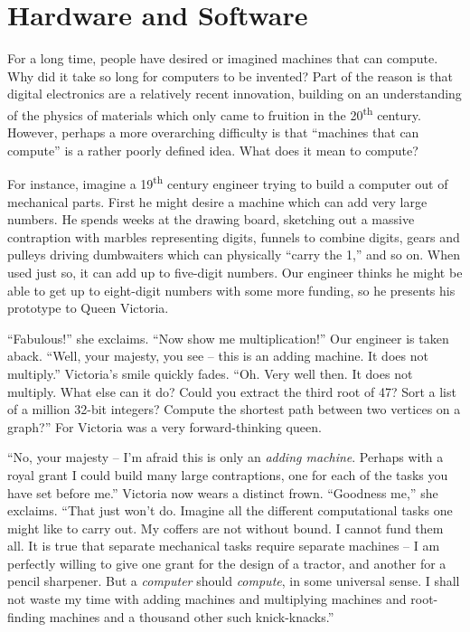 \chapter{Hardware and Software}\label{ch:hardware_software}

For a long time, people have desired or imagined machines that can compute. Why did it take so long for computers to be invented? Part of the reason is that digital electronics are a relatively recent innovation, building on an understanding of the physics of materials which only came to fruition in the 20\textsuperscript{th} century. However, perhaps a more overarching difficulty is that ``machines that can compute'' is a rather poorly defined idea. What does it mean to compute?

For instance, imagine a 19\textsuperscript{th} century engineer trying to build a computer out of mechanical parts. First he might desire a machine which can add very large numbers. He spends weeks at the drawing board, sketching out a massive contraption with marbles representing digits, funnels to combine digits, gears and pulleys driving dumbwaiters which can physically ``carry the 1,'' and so on. When used just so, it can add up to five-digit numbers. Our engineer thinks he might be able to get up to eight-digit numbers with some more funding, so he presents his prototype to Queen Victoria.

``Fabulous!'' she exclaims. ``Now show me multiplication!'' Our engineer is taken aback. ``Well, your majesty, you see -- this is an adding machine. It does not multiply.'' Victoria's smile quickly fades. ``Oh. Very well then. It does not multiply. What else can it do? Could you extract the third root of 47? Sort a list of a million 32-bit integers? Compute the shortest path between two vertices on a graph?'' For Victoria was a very forward-thinking queen.

``No, your majesty -- I'm afraid this is only an \emph{adding machine}. Perhaps with a royal grant I could build many large contraptions, one for each of the tasks you have set before me.'' Victoria now wears a distinct frown. ``Goodness me,'' she exclaims. ``That just won't do. Imagine all the different computational tasks one might like to carry out. My coffers are not without bound. I cannot fund them all. It is true that separate mechanical tasks require separate machines -- I am perfectly willing to give one grant for the design of a tractor, and another for a pencil sharpener. But a \emph{computer} should \emph{compute}, in some universal sense. I shall not waste my time with adding machines and multiplying machines and root-finding machines and a thousand other such knick-knacks.''


